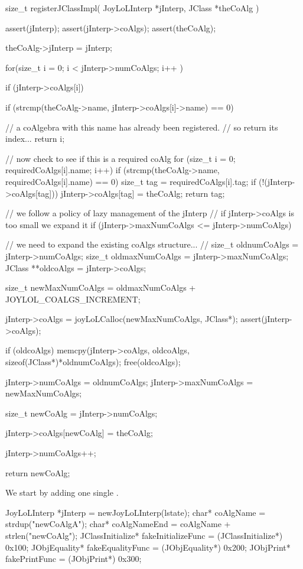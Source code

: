 \startCCode
size_t registerJClassImpl(
  JoyLoLInterp *jInterp,
  JClass *theCoAlg
) {
  assert(jInterp);
  assert(jInterp->coAlgs);
  assert(theCoAlg);
  
  theCoAlg->jInterp = jInterp;
  
  for(size_t i = 0; i < jInterp->numCoAlgs; i++ ) {
    if (jInterp->coAlgs[i]) {
      if (strcmp(theCoAlg->name,
        jInterp->coAlgs[i]->name) == 0) {
    
        // a coAlgebra with this name has already been registered. 
        // so return its index...
        return i;
      }
    }
  }

  // now check to see if this is a required coAlg
  for (size_t i = 0; requiredCoAlgs[i].name; i++) {
    if (strcmp(theCoAlg->name, requiredCoAlgs[i].name) == 0) {
      size_t tag = requiredCoAlgs[i].tag;
      if (!(jInterp->coAlgs[tag])) {
        jInterp->coAlgs[tag] = theCoAlg;
      }
      return tag;
    }
  }

  // we follow a policy of lazy management of the jInterp
  // if jInterp->coAlgs is too small we expand it
  if (jInterp->maxNumCoAlgs <= jInterp->numCoAlgs) {
    // we need to expand the existing coAlgs structure...
    //  
    size_t oldnumCoAlgs     = jInterp->numCoAlgs;
    size_t oldmaxNumCoAlgs  = jInterp->maxNumCoAlgs;
    JClass **oldcoAlgs = jInterp->coAlgs;
    
    size_t newMaxNumCoAlgs =
      oldmaxNumCoAlgs + JOYLOL_COALGS_INCREMENT;

    jInterp->coAlgs =
      joyLoLCalloc(newMaxNumCoAlgs, JClass*);
    assert(jInterp->coAlgs);
    
    if (oldcoAlgs) {
      memcpy(jInterp->coAlgs,
        oldcoAlgs,
        sizeof(JClass*)*oldnumCoAlgs);
      free(oldcoAlgs);
    }
    
    jInterp->numCoAlgs    = oldnumCoAlgs;
    jInterp->maxNumCoAlgs = newMaxNumCoAlgs;
  }
  
  size_t newCoAlg = jInterp->numCoAlgs;
  
  jInterp->coAlgs[newCoAlg] = theCoAlg;
  
  jInterp->numCoAlgs++;
  
  return newCoAlg;
}
\stopCCode


We start by adding one single . 

\startCTest
  JoyLoLInterp *jInterp = newJoyLoLInterp(lstate);
  char*             coAlgName          = strdup("newCoAlgA");
  char*             coAlgNameEnd       = coAlgName + strlen("newCoAlg");
  JClassInitialize* fakeInitializeFunc = (JClassInitialize*) 0x100;
  JObjEquality*    fakeEqualityFunc    = (JObjEquality*)   0x200;
  JObjPrint*       fakePrintFunc       = (JObjPrint*)      0x300;
  
